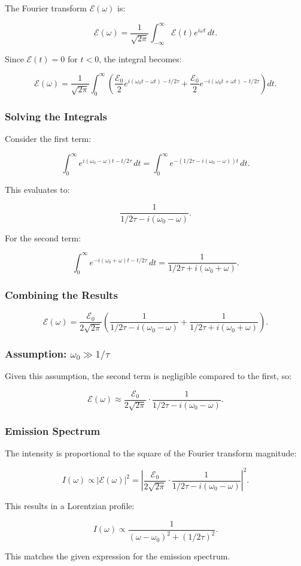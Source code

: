 \documentclass{article}
\begin{document}
The Fourier transform \(\mathcal{E}(\omega)\) is:

\[
\mathcal{E}(\omega) = \frac{1}{\sqrt{2\pi}} \int_{-\infty}^{\infty} \mathcal{E}(t) e^{i\omega t} \, dt.
\]

Since \(\mathcal{E}(t) = 0\) for \(t < 0\), the integral becomes:

\[
\mathcal{E}(\omega) = \frac{1}{\sqrt{2\pi}} \int_{0}^{\infty} \left( \frac{\mathcal{E}_0}{2} e^{i(\omega_0 t - \omega t) - t/2\tau} + \frac{\mathcal{E}_0}{2} e^{-i(\omega_0 t + \omega t) - t/2\tau} \right) dt.
\]

\subsubsection*{Solving the Integrals}

Consider the first term:

\[
\int_{0}^{\infty} e^{i(\omega_0 - \omega)t - t/2\tau} \, dt = \int_{0}^{\infty} e^{-(1/2\tau - i(\omega_0 - \omega))t} \, dt.
\]

This evaluates to:

\[
\frac{1}{1/2\tau - i(\omega_0 - \omega)}.
\]

For the second term:

\[
\int_{0}^{\infty} e^{-i(\omega_0 + \omega)t - t/2\tau} \, dt = \frac{1}{1/2\tau + i(\omega_0 + \omega)}.
\]

\subsubsection*{Combining the Results}

\[
\mathcal{E}(\omega) = \frac{\mathcal{E}_0}{2\sqrt{2\pi}} \left( \frac{1}{1/2\tau - i(\omega_0 - \omega)} + \frac{1}{1/2\tau + i(\omega_0 + \omega)} \right).
\]

\subsubsection*{Assumption: \(\omega_0 \gg 1/\tau\)}

Given this assumption, the second term is negligible compared to the first, so:

\[
\mathcal{E}(\omega) \approx \frac{\mathcal{E}_0}{2\sqrt{2\pi}} \cdot \frac{1}{1/2\tau - i(\omega_0 - \omega)}.
\]

\subsubsection*{Emission Spectrum}

The intensity is proportional to the square of the Fourier transform magnitude:

\[
I(\omega) \propto |\mathcal{E}(\omega)|^2 = \left|\frac{\mathcal{E}_0}{2\sqrt{2\pi}} \cdot \frac{1}{1/2\tau - i(\omega_0 - \omega)}\right|^2.
\]

This results in a Lorentzian profile:

\[
I(\omega) \propto \frac{1}{(\omega - \omega_0)^2 + (1/2\tau)^2}.
\]

This matches the given expression for the emission spectrum.
\end{document}

